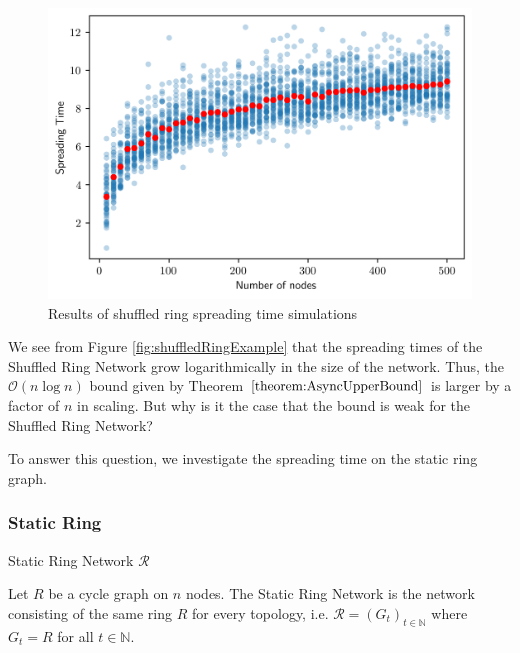 \begin{figure}[h]
	\centering
	\includegraphics[width=1\textwidth]{./figures/shuffle_ring_simulation_results.png}
	\caption{Results of shuffled ring spreading time simulations}
	\label{fig:shuffleRingSimResults}
\end{figure}

We see from Figure \ref{fig:shuffledRingExample} that the spreading times of the Shuffled Ring Network grow logarithmically in the size of the network. %
Thus, the $\mathcal{O}(n \log n)$ bound given by Theorem $\ref{theorem:AsyncUpperBound}$ is larger by a factor of $n$ in scaling. 
But why is it the case that the bound is weak for the Shuffled Ring Network? 

To answer this question, we investigate the spreading time on the static ring graph.

\subsubsection{Static Ring}

\begin{definition}
	Static Ring Network $\mathcal{R}$

	\noindent
	Let $R$ be a cycle graph on $n$ nodes. The Static Ring Network is the network consisting of the same ring $R$ for every topology, i.e. $\mathcal{R} = (G_t)_{t \in \mathbb{N}}$ where $G_t = R$ for all $t \in \mathbb{N}$. 
\end{definition}

